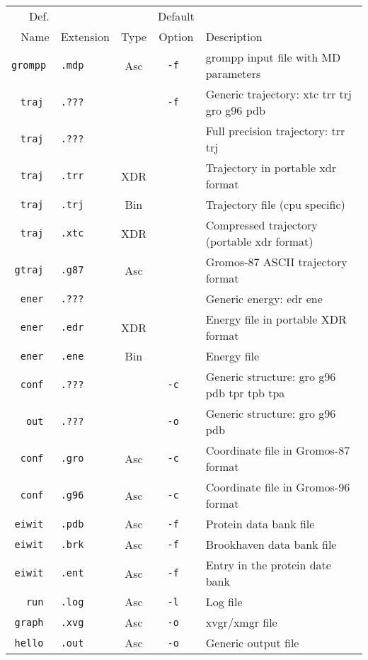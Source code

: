 \begin{table}[p]
\begin{tabularx}{\linewidth}{rlccX}
\hline
    Def. &           &      & Default &  \\
    Name & Extension & Type &  Option & Description \\
\hline
\tt   grompp & \tt .mdp & Asc & \tt -f & grompp input file with MD parameters \\
\tt     traj & \tt .??? &     & \tt -f & Generic trajectory: xtc trr trj gro g96 pdb \\
\tt     traj & \tt .??? &     & \tt    & Full precision trajectory: trr trj \\
\tt     traj & \tt .trr & XDR & \tt    & Trajectory in portable xdr format \\
\tt     traj & \tt .trj & Bin & \tt    & Trajectory file (cpu specific) \\
\tt     traj & \tt .xtc & XDR & \tt    & Compressed trajectory (portable xdr format) \\
\tt    gtraj & \tt .g87 & Asc & \tt    & Gromos-87 ASCII trajectory format \\
\tt     ener & \tt .??? &     & \tt    & Generic energy: edr ene \\
\tt     ener & \tt .edr & XDR & \tt    & Energy file in portable XDR format \\
\tt     ener & \tt .ene & Bin & \tt    & Energy file \\
\tt     conf & \tt .??? &     & \tt -c & Generic structure: gro g96 pdb tpr tpb tpa \\
\tt      out & \tt .??? &     & \tt -o & Generic structure: gro g96 pdb \\
\tt     conf & \tt .gro & Asc & \tt -c & Coordinate file in Gromos-87 format \\
\tt     conf & \tt .g96 & Asc & \tt -c & Coordinate file in Gromos-96 format \\
\tt    eiwit & \tt .pdb & Asc & \tt -f & Protein data bank file \\
\tt    eiwit & \tt .brk & Asc & \tt -f & Brookhaven data bank file \\
\tt    eiwit & \tt .ent & Asc & \tt -f & Entry in the protein date bank \\
\tt      run & \tt .log & Asc & \tt -l & Log file \\
\tt    graph & \tt .xvg & Asc & \tt -o & xvgr/xmgr file \\
\tt    hello & \tt .out & Asc & \tt -o & Generic output file \\

\end{tabularx}
\end{table}
